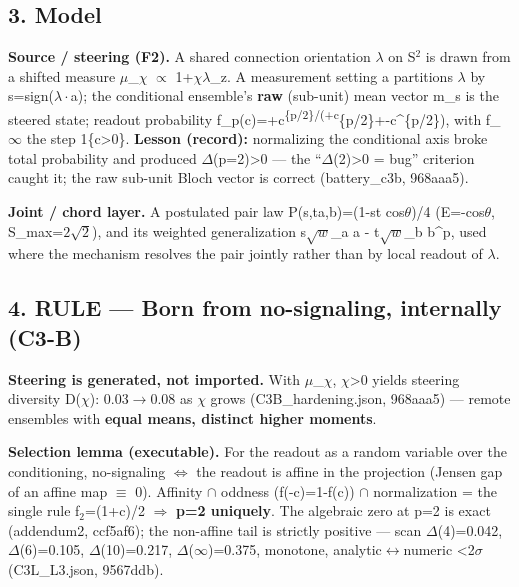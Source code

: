 \documentclass[
  11pt]{article}
\begin{document}
\subsection{3. Model}\label{model}

\textbf{Source / steering (F2).} A shared connection orientation $\lambda$ on S$^{2}$
is drawn from a shifted measure $\mu$\_$\chi$ $\propto$ 1+$\chi\lambda$\_z. A measurement setting a
partitions $\lambda$ by s=sign($\lambda\cdot$a); the conditional ensemble's \textbf{raw}
(sub-unit) mean vector m\_s is the steered state; readout probability
f\_p(c)=+c\textbar{}\textsuperscript{\{p/2\}/(+c\textbar{}}\{p/2\}+-c\textbar\^{}\{p/2\}),
with f\_$\infty$ the step 1\{c\textgreater0\}. \textbf{Lesson (record):}
normalizing the conditional axis broke total probability and produced
$\Delta$(p=2)\textgreater0 --- the ``$\Delta$(2)\textgreater0 = bug'' criterion caught
it; the raw sub-unit Bloch vector is correct (battery\_c3b, 968aaa5).

\textbf{Joint / chord layer.} A postulated pair law
P(s,t\textbar a,b)=(1-st cos$\theta$)/4 (E=-cos$\theta$, S\_max=$2\sqrt{2}$), and its weighted
generalization \textbar s$\sqrt{w}$\_a a - t$\sqrt{w}$\_b b\textbar\^{}p, used where the
mechanism resolves the pair jointly rather than by local readout of $\lambda$.

\subsection{4. RULE --- Born from no-signaling, internally
(C3-B)}\label{rule-born-from-no-signaling-internally-c3-b}

\textbf{Steering is generated, not imported.} With $\mu$\_$\chi$, $\chi$\textgreater0
yields steering diversity D($\chi$): 0.03$\to$0.08 as $\chi$ grows
(C3B\_hardening.json, 968aaa5) --- remote ensembles with \textbf{equal
means, distinct higher moments}.

\textbf{Selection lemma (executable).} For the readout as a random
variable over the conditioning, no-signaling $\Leftrightarrow$ the readout is affine in
the projection (Jensen gap of an affine map $\equiv$ 0). Affinity $\cap$ oddness
(f(-c)=1-f(c)) $\cap$ normalization = the single rule f$_{2}$=(1+c)/2 $\Rightarrow$
\textbf{p=2 uniquely}. The algebraic zero at p=2 is exact (addendum2,
ccf5af6); the non-affine tail is strictly positive --- scan $\Delta$(4)=0.042,
$\Delta$(6)=0.105, $\Delta$(10)=0.217, $\Delta$($\infty$)=0.375, monotone, analytic$\leftrightarrow$numeric
\textless2$\sigma$ (C3L\_L3.json, 9567ddb).
\end{document}

